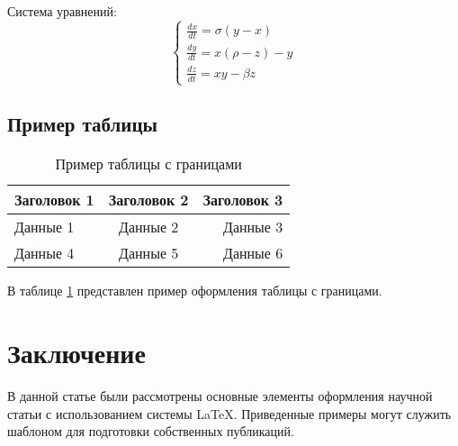 Система уравнений:
\[
\begin{cases}
    \frac{dx}{dt} = \sigma(y - x) \\
    \frac{dy}{dt} = x(\rho - z) - y \\
    \frac{dz}{dt} = xy - \beta z
\end{cases}
\]

\subsection{Пример таблицы}
\label{subsec:table}

\begin{table}[h]
    \centering
    \caption{Пример таблицы с границами}
    \label{tab:example}
    \begin{tabular}{|l|c|r|}
        \hline
        Заголовок 1 & Заголовок 2 & Заголовок 3 \\
        \hline
        Данные 1 & Данные 2 & Данные 3 \\
        \hline
        Данные 4 & Данные 5 & Данные 6 \\
        \hline
    \end{tabular}
\end{table}

В таблице \ref{tab:example} представлен пример оформления таблицы с границами.

\section{Заключение}
\label{sec:conclusion}

В данной статье были рассмотрены основные элементы оформления научной статьи с использованием системы \LaTeX. Приведенные примеры могут служить шаблоном для подготовки собственных публикаций.
